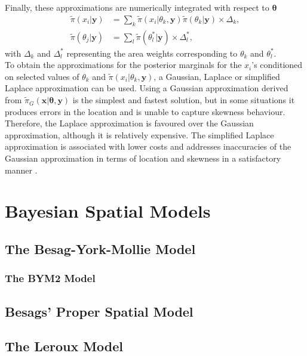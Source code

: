 Finally, these approximations are numerically integrated with respect to $\pmb{\theta}$
\begin{align}
    \widetilde{\pi}\left(x_i|\pmb{y}\right)&=\sum_k\widetilde{\pi}\left(x_i|\theta_k,\pmb{y}\right)\widetilde{\pi}\left(\theta_k|\pmb{y}\right)\times\Delta_k,\\
    \widetilde{\pi}\left(\theta_j|\pmb{y}\right)&=\sum_l\widetilde{\pi}\left(\theta_l^*|\pmb{y}\right)\times\Delta_l^*,
\end{align}
with $\Delta_k$ and $\Delta_l^*$ representing the area weights corresponding to $\theta_k$ and $\theta_l^*$. \\
To obtain the approximations for the posterior marginals for the $x_i$'s conditioned on selected values of $\theta_k$ and $\widetilde{\pi}\left(x_i|\theta_k,\pmb{y}\right)$, a Gaussian, Laplace or simplified Laplace approximation can be used. Using a Gaussian approximation derived from $\widetilde{\pi}_G\left(\pmb{x}|\pmb{\theta},\pmb{y}\right)$ is the simplest and fastest solution, but in some situations it produces errors in the location and is unable to capture skewness behaviour. Therefore, the Laplace approximation is favoured over the Gaussian approximation, although it is relatively expensive. The simplified Laplace approximation is associated with lower costs and addresses inaccuracies of the Gaussian approximation in terms of location and skewness in a satisfactory manner \autocite[][]{moraga2019geospatial}.
\clearpage
\section{Bayesian Spatial Models}
\subsection{The Besag-York-Mollie Model}
\autocite[][]{besag1991bayesian}
\subsubsection{The BYM2 Model}
\autocite[][]{simpson2017penalising}
\subsection{Besags' Proper Spatial Model}
\autocite[][]{besag1974spatial}
\subsection{The Leroux Model}
\autocite[][]{leroux2000estimation}
\clearpage
